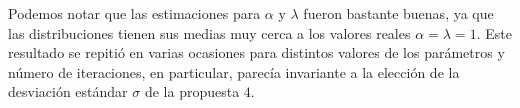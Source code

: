 Podemos notar que las estimaciones para $\alpha$ y $\lambda$ fueron bastante buenas, ya que las distribuciones tienen sus medias muy cerca a los valores reales $\alpha=\lambda=1$. Este resultado se repitió en varias ocasiones para distintos valores de los parámetros y número de iteraciones, en particular, parecía invariante a la elección de la desviación estándar $\sigma$ de la propuesta $4$.